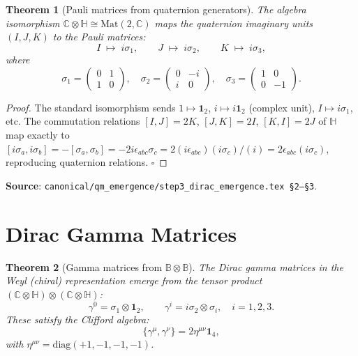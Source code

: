 \documentclass[11pt,a4paper]{article}
\newtheorem{theorem}{Theorem}[section]
\theoremstyle{definition}
\theoremstyle{remark}
\begin{document}
\begin{theorem}[Pauli matrices from quaternion generators]\label{thm:pauli}
The algebra isomorphism $\mathbb{C}\otimes\mathbb{H} \cong \mathrm{Mat}(2,\mathbb{C})$
maps the quaternion imaginary units $(I,J,K)$ to the Pauli matrices:
\begin{equation}\label{eq:pauli_map}
  I \;\mapsto\; i\sigma_1,
  \qquad
  J \;\mapsto\; i\sigma_2,
  \qquad
  K \;\mapsto\; i\sigma_3,
\end{equation}
where
\begin{equation}
  \sigma_1 = \begin{pmatrix}0&1\\1&0\end{pmatrix},\quad
  \sigma_2 = \begin{pmatrix}0&-i\\i&0\end{pmatrix},\quad
  \sigma_3 = \begin{pmatrix}1&0\\0&-1\end{pmatrix}.
\end{equation}
\end{theorem}

\begin{proof}
The standard isomorphism sends $1 \mapsto \mathbf{1}_2$,
$i \mapsto i\mathbf{1}_2$ (complex unit), $I \mapsto i\sigma_1$, etc.
The commutation relations $[I,J]=2K$, $[J,K]=2I$, $[K,I]=2J$ of $\mathbb{H}$
map exactly to $[i\sigma_a, i\sigma_b] = -[\sigma_a,\sigma_b]
= -2i\epsilon_{abc}\sigma_c = 2(i\epsilon_{abc})(i\sigma_c)/(i)
= 2\epsilon_{abc}(i\sigma_c)$, reproducing quaternion relations.
$\square$
\end{proof}

\noindent\textbf{Source}: \texttt{canonical/qm\_emergence/step3\_dirac\_emergence.tex \S2--\S3}.

\section{Dirac Gamma Matrices}\label{sec:gamma}

\begin{theorem}[Gamma matrices from $\mathbb{B}\otimes\mathbb{B}$]\label{thm:gamma}
The Dirac gamma matrices in the Weyl (chiral) representation emerge from
the tensor product $(\mathbb{C}\otimes\mathbb{H}) \otimes (\mathbb{C}\otimes\mathbb{H})$:
\begin{equation}\label{eq:gamma_weyl}
  \gamma^0 = \sigma_1 \otimes \mathbf{1}_2,
  \qquad
  \gamma^i = i\sigma_2 \otimes \sigma_i,\quad i=1,2,3.
\end{equation}
These satisfy the Clifford algebra:
\begin{equation}\label{eq:clifford}
  \{\gamma^\mu, \gamma^\nu\} = 2\eta^{\mu\nu}\mathbf{1}_4,
\end{equation}
with $\eta^{\mu\nu} = \mathrm{diag}(+1,-1,-1,-1)$.
\end{theorem}
\end{document}
